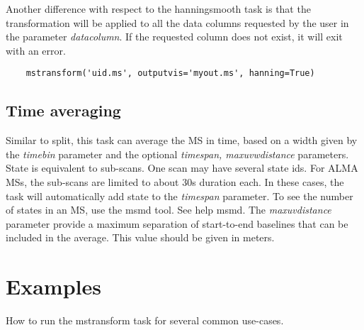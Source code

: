 Another difference with respect to the hanningsmooth task is that the transformation will be 
applied to all the data columns requested by the user in the parameter {\it datacolumn}. If the 
requested column does not exist, it will exit with an error. 

\begin{verbatim}
    mstransform('uid.ms', outputvis='myout.ms', hanning=True)
\end{verbatim}

\subsection{Time averaging}
Similar to split, this task can average the MS in time, based on a width given by the
{\it timebin} parameter and the optional {\it timespan, maxuvwdistance}
parameters. State is equivalent to sub-scans. One scan may have several
state ids. For ALMA MSs, the sub-scans are limited to about 30s duration each.
In these cases, the task will automatically add state to the {\it timespan} 
parameter. To see the number of states in an MS, use the msmd tool. See help
msmd. The {\it maxuvdistance} parameter provide a maximum separation of
start-to-end baselines that can be included in the average. This value should be
given in meters.



\section{Examples}\label{Sec:Examples}
How to run the mstransform task for several common use-cases.

